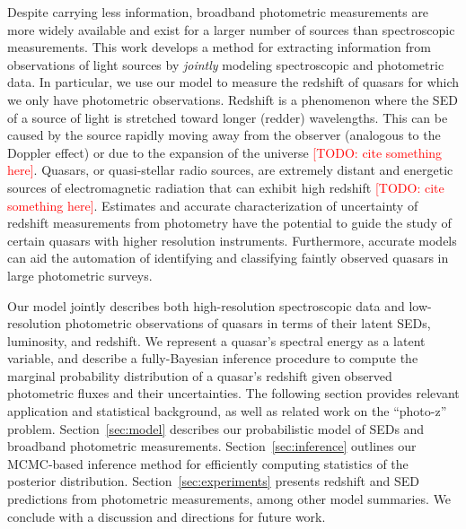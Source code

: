 \documentclass{article}
\newcommand{\red}[1]{\textcolor{red}{[TODO: #1]}}
\begin{document}
Despite carrying less information, broadband photometric measurements are more widely available and exist for a larger number of sources than spectroscopic measurements. 
This work develops a method for extracting information from observations of light sources by \emph{jointly} modeling spectroscopic and photometric data.  
In particular, we use our model to measure the redshift of quasars for which we only have photometric observations.  
Redshift is a phenomenon where the SED of a source of light is stretched toward longer (redder) wavelengths.  This can be caused by the source rapidly moving away from the observer (analogous to the Doppler effect) or due to the expansion of the universe \red{cite something here}.  
Quasars, or quasi-stellar radio sources, are extremely distant and energetic sources of electromagnetic radiation that can exhibit high redshift \red{cite something here}.  
Estimates and accurate characterization of uncertainty of redshift measurements from photometry have the potential to guide the study of certain quasars with higher resolution instruments.  
Furthermore, accurate models can aid the automation of identifying and classifying faintly observed quasars in large photometric surveys.  

Our model jointly describes both high-resolution spectroscopic data and low-resolution photometric observations of quasars in terms of their latent SEDs, luminosity, and redshift.  We represent a quasar's spectral energy as a latent variable, and describe a fully-Bayesian inference procedure to compute the marginal probability distribution of a quasar's redshift given observed photometric fluxes and their uncertainties.  The following section provides relevant application and statistical background, as well as related work on the ``photo-z'' problem.  Section~\ref{sec:model} describes our probabilistic model of SEDs and broadband photometric measurements.  Section~\ref{sec:inference} outlines our MCMC-based inference method for efficiently computing statistics of the posterior distribution. Section~\ref{sec:experiments} presents redshift and SED predictions from photometric measurements, among other model summaries.  We conclude with a discussion and directions for future work.  
\end{document}
